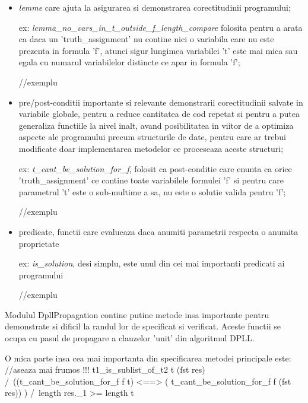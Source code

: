 {\begin{itemize}
	ex: \textit{get\_clause\_value }- returneaza valoarea de adevar a unei clauze considerand un 'truth\_assignment' primit ca parametru;
	
	\item \textit{lemme} care ajuta la asigurarea si demonstrarea corectitudinii programului;
	
	ex: \textit{lemma\_no\_vars\_in\_t\_outside\_f\_length\_compare} folosita pentru a arata ca daca un 'truth\_assignment' nu contine nici o variabila care nu este prezenta in formula 'f', atunci sigur lungimea variabilei 't' este mai mica sau egala cu numarul variabilelor distincte ce apar in formula 'f';
	
	//exemplu
	
	\item pre/post-conditii importante si relevante demonstrarii corectitudinii salvate in variabile globale, pentru a reduce cantitatea de cod repetat si pentru a putea generaliza functiile la nivel inalt, avand posibilitatea in viitor de a optimiza aspecte ale programului precum structurile de date, pentru care ar trebui modificate doar implementarea metodelor ce proceseaza aceste structuri;
	
	ex: \textit{t\_cant\_be\_solution\_for\_f}, folosit ca post-conditie care enunta ca orice 'truth\_assignment' ce contine toate variabilele formulei 'f' si pentru care parametrul 't' este o sub-multime a sa, nu este o solutie valida pentru 'f';
	
	//exemplu
	
	
	\item predicate, functii care evalueaza daca anumiti parametrii respecta o anumita proprietate
	
	ex: \textit{is\_solution}, desi simplu, este unul din cei mai importanti predicati ai programului
	
	//exemplu
	
\end{itemize}


Modulul DpllPropagation contine putine metode insa importante pentru demonstrate si dificil la randul lor de specificat si verificat. Aceste functii se ocupa cu pasul de propagare a clauzelor 'unit' din algoritmul DPLL.

O mica parte insa cea mai importanta din specificarea metodei principale este:
//aseaza mai frumos
!!!
 t1\_is\_sublist\_of\_t2 t (fst res)
	/\ ((t\_cant\_be\_solution\_for\_f f t) <==> ( t\_cant\_be\_solution\_for\_f f (fst res)) )
	/\ length res.\_1 >= length t
	
}

